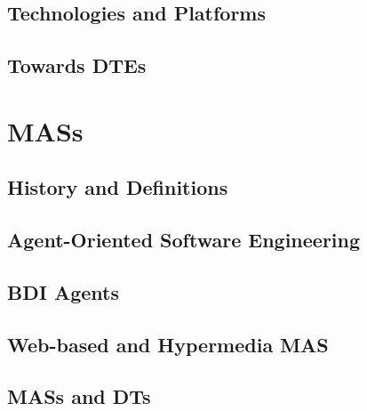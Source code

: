 \documentclass[12pt,a4paper,openright,twoside]{book}
\begin{document}
\section{Technologies and Platforms}

\section{Towards \aclp{DTE}}


\chapter{\aclp{MAS}}
\label{chap:back:MAS}

\section{History and Definitions}

\section{Agent-Oriented Software Engineering}

\section{\acl{BDI} Agents}

\section{Web-based and Hypermedia \ac{MAS}}

\section{\aclp{MAS} and \aclp{DT}}
\end{document}
